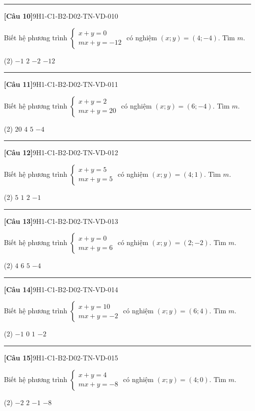 \documentclass[12pt,a4paper]{article}
\newif\ifloigiai
\newenvironment{cauhoi}[2]{%
  \par\medskip\noindent\rule{\textwidth}{0.4pt}\par\nopagebreak
  \noindent\textbf{[#1]}\hfill{\scriptsize\ttfamily #2}\par\nopagebreak\smallskip}{\par}
\newcommand{\dapan}[1]{\ifloigiai\par\smallskip\noindent\textit{Đáp án:} \textbf{#1}\par\fi}
\begin{document}
\begin{cauhoi}{Câu 10}{9H1-C1-B2-D02-TN-VD-010}
Biết hệ phương trình $\begin{cases}x+y=0\\ mx+y=-12\end{cases}$ có nghiệm $(x;y)=(4;-4)$. Tìm $m$.
\begin{tasks}(2)
\task $-1$
\task $2$
\task $-2$
\task $-12$
\end{tasks}
\dapan{C}
\end{cauhoi}
\begin{cauhoi}{Câu 11}{9H1-C1-B2-D02-TN-VD-011}
Biết hệ phương trình $\begin{cases}x+y=2\\ mx+y=20\end{cases}$ có nghiệm $(x;y)=(6;-4)$. Tìm $m$.
\begin{tasks}(2)
\task $20$
\task $4$
\task $5$
\task $-4$
\end{tasks}
\dapan{B}
\end{cauhoi}
\begin{cauhoi}{Câu 12}{9H1-C1-B2-D02-TN-VD-012}
Biết hệ phương trình $\begin{cases}x+y=5\\ mx+y=5\end{cases}$ có nghiệm $(x;y)=(4;1)$. Tìm $m$.
\begin{tasks}(2)
\task $5$
\task $1$
\task $2$
\task $-1$
\end{tasks}
\dapan{B}
\end{cauhoi}
\begin{cauhoi}{Câu 13}{9H1-C1-B2-D02-TN-VD-013}
Biết hệ phương trình $\begin{cases}x+y=0\\ mx+y=6\end{cases}$ có nghiệm $(x;y)=(2;-2)$. Tìm $m$.
\begin{tasks}(2)
\task $4$
\task $6$
\task $5$
\task $-4$
\end{tasks}
\dapan{A}
\end{cauhoi}
\begin{cauhoi}{Câu 14}{9H1-C1-B2-D02-TN-VD-014}
Biết hệ phương trình $\begin{cases}x+y=10\\ mx+y=-2\end{cases}$ có nghiệm $(x;y)=(6;4)$. Tìm $m$.
\begin{tasks}(2)
\task $-1$
\task $0$
\task $1$
\task $-2$
\end{tasks}
\dapan{A}
\end{cauhoi}
\begin{cauhoi}{Câu 15}{9H1-C1-B2-D02-TN-VD-015}
Biết hệ phương trình $\begin{cases}x+y=4\\ mx+y=-8\end{cases}$ có nghiệm $(x;y)=(4;0)$. Tìm $m$.
\begin{tasks}(2)
\task $-2$
\task $2$
\task $-1$
\task $-8$
\end{tasks}
\dapan{A}
\end{cauhoi}
\end{document}

